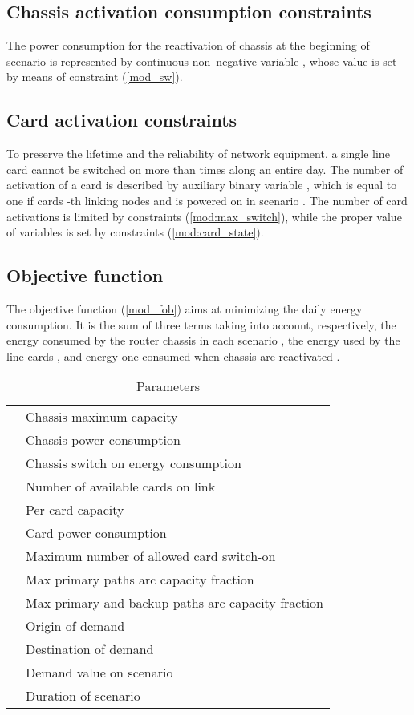 \documentclass[final,5p,times,twocolumn]{elsarticle}
\begin{document}
\subsection{Chassis activation consumption constraints}
The power consumption for the reactivation of chassis  at the beginning of scenario  is represented by continuous non~negative variable , whose value is set by means of constraint (\ref{mod_sw}).


\subsection{Card activation constraints}
To preserve the lifetime and the reliability of network equipment, a single line card cannot be switched on more than  times along an entire day. The number of activation of a card is described by auxiliary binary variable , which is equal to one if cards -th linking nodes  and  is powered on in scenario . The number of card activations is limited by constraints (\ref{mod:max_switch}), while the proper value of variables  is set by constraints (\ref{mod:card_state}).



\subsection{Objective function}
The objective function (\ref{mod_fob}) aims at minimizing the daily energy consumption. It is the sum of three terms taking into account, respectively, the energy consumed by the router chassis in each scenario , the energy used by the line cards , and energy one consumed when chassis are reactivated .





\begin{table}[htc]
\begin{tabular}{c|l}
\hline
 & Chassis maximum capacity\\
 & Chassis power consumption\\
 & Chassis switch on energy consumption\\
\hline
 & Number of available cards on link  \\
 & Per card capacity\\ & Card power consumption\\\hline
 & Maximum number of allowed card switch-on\\
 & Max  primary paths arc capacity fraction\\
 & Max primary and backup paths arc capacity fraction\\
\hline
 & Origin of demand \\
 & Destination of demand \\
 & Demand value on scenario \\
 & Duration of scenario \\
\hline
\end{tabular}
\caption{Parameters}\label{tab::parameters}
\end{table}
\end{document}
